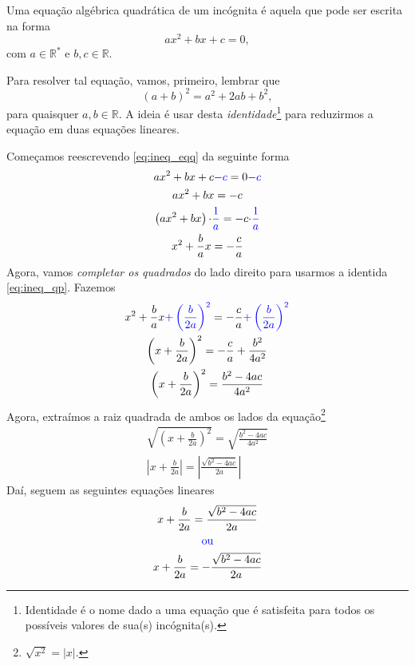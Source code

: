 Uma equação algébrica quadrática de um incógnita é aquela que pode ser escrita na forma
\begin{equation}\label{eq:ineq_eqq}
  ax^2 + bx + c = 0,
\end{equation}
com $a\in\mathbb{R}^*$ e $b,c\in\mathbb{R}$.

Para resolver tal equação, vamos, primeiro, lembrar que
\begin{equation}\label{eq:ineq_qp}
  (a + b)^2 = a^2 + 2ab + b^2,
\end{equation}
para quaisquer $a,b\in\mathbb{R}$. A ideia é usar desta \emph{identidade}\footnote{Identidade é o nome dado a uma equação que é satisfeita para todos os possíveis valores de sua(s) incógnita(s).} para reduzirmos a equação em duas equações lineares.

Começamos reescrevendo \eqref{eq:ineq_eqq} da seguinte forma
\begin{gather}
  ax^2 + bx + c {\color{blue}- c} = 0 {\color{blue}- c}\\
  ax^2 + bx = -c\\
  \left(ax^2 + bx\right){\cdot \color{blue}\frac{1}{a}} = -c{\cdot \color{blue}\frac{1}{a}} \\
  x^2 + \frac{b}{a}x = -\frac{c}{a}
\end{gather}
Agora, vamos \emph{completar os quadrados} do lado direito para usarmos a identida \eqref{eq:ineq_qp}. Fazemos
\begin{gather}
  x^2 + \frac{b}{a}x {\color{blue}+ \left(\frac{b}{2a}\right)^2} = -\frac{c}{a}  {\color{blue}+ \left(\frac{b}{2a}\right)^2} \\
  \left(x + \frac{b}{2a}\right)^2 = -\frac{c}{a} + \frac{b^2}{4a^2} \\
  \left(x + \frac{b}{2a}\right)^2 = \frac{b^2 - 4ac}{4a^2}
\end{gather}
Agora, extraímos a raiz quadrada de ambos os lados da equação\footnote{$\sqrt{x^2}=|x|$.}
\begin{gather}
  \sqrt{\left(x + \frac{b}{2a}\right)^2} = \sqrt{\frac{b^2 - 4ac}{4a^2}} \\
  \left|x + \frac{b}{2a}\right| = \left|\frac{\sqrt{b^2 - 4ac}}{2a}\right|
\end{gather}
Daí, seguem as seguintes equações lineares
\begin{gather}
  x + \frac{b}{2a} = \frac{\sqrt{b^2 - 4ac}}{2a}\\
  {\color{blue}\text{ou}}\nonumber\\
  x + \frac{b}{2a} = -\frac{\sqrt{b^2 - 4ac}}{2a}\\
\end{gather}
